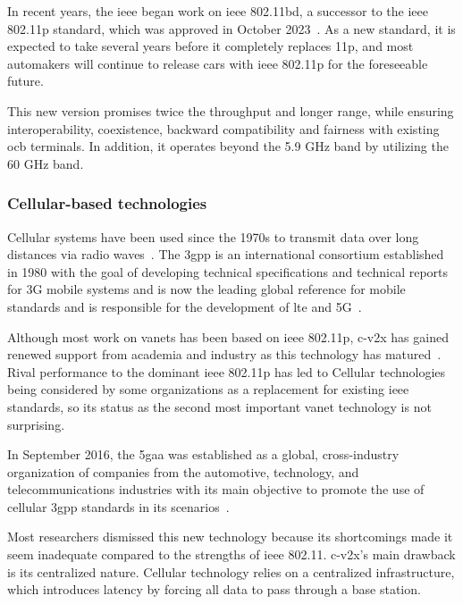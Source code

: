 In recent years, the \gls{ieee} began work on \gls{ieee} 802.11bd, a successor to the \gls{ieee} 802.11p standard, which was approved in October 2023~\cite{noauthor_ieee_2023}. As a new standard, it is expected to take several years before it completely replaces 11p, and most automakers will continue to release cars with \gls{ieee} 802.11p for the foreseeable future.

This new version promises twice the throughput and longer range, while ensuring interoperability, coexistence, backward compatibility and fairness with existing \gls{ocb} terminals. In addition, it operates beyond the 5.9 GHz band by utilizing the 60 GHz band.


\subsubsection{Cellular-based technologies}
Cellular systems have been used since the 1970s to transmit data over long distances via radio waves~\cite{anwer_survey_2014}. The \gls{3gpp} is an international consortium established in 1980 with the goal of developing technical specifications and technical reports for 3G mobile systems and is now the leading global reference for mobile standards and is responsible for the development of \gls{lte} and 5G~\cite{noauthor_3gpp_nodate}.

Although most work on \glspl{vanet} has been based on \gls{ieee} 802.11p, \gls{c-v2x} has gained renewed support from academia and industry as this technology has matured~\cite{gyawali_challenges_2021}. Rival performance to the dominant \gls{ieee} 802.11p has led to Cellular technologies being considered by some organizations as a replacement for existing \gls{ieee} standards, so its status as the second most important \gls{vanet} technology is not surprising.

In September 2016, the \gls{5gaa} was established as a global, cross-industry organization of companies from the automotive, technology, and telecommunications industries with its main objective to promote the use of cellular \gls{3gpp} standards in \gls{its} scenarios~\cite{noauthor_5gaa_nodate}.

Most researchers dismissed this new technology because its shortcomings made it seem inadequate compared to the strengths of \gls{ieee} 802.11. \gls{c-v2x}'s main drawback is its centralized nature. Cellular technology relies on a centralized infrastructure, which introduces latency by forcing all data to pass through a base station.


